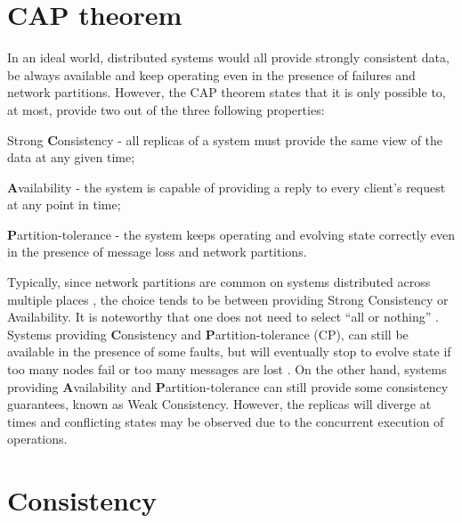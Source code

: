 
\section{CAP theorem}
\label{sec:cap}


In an ideal world, distributed systems would all provide strongly consistent data, be always available and keep operating even in the presence of failures and network partitions.
However, the CAP theorem \cite{cap} states that it is only possible to, at most, provide two out of the three following properties:
\begin{enumerate*}[label=(\roman*)]
	\item Strong \textbf{C}onsistency - all replicas of a system must provide the same view of the data at any given time;
	\item \textbf{A}vailability - the system is capable of providing a reply to every client's request at any point in time;
	\item \textbf{P}artition-tolerance - the system keeps operating and evolving state correctly even in the presence of message loss and network partitions.
\end{enumerate*}

Typically, since network partitions are common on systems distributed across multiple places \cite{understandingEC}, the choice tends to be between providing Strong Consistency or Availability.
It is noteworthy that one does not need to select ``all or nothing'' \cite{understandingEC}. 
Systems providing \textbf{C}onsistency and \textbf{P}artition-tolerance (CP), can still be available in the presence of some faults, but will eventually stop to evolve state if too many nodes fail or too many messages are lost \cite{cap}.
On the other hand, systems providing \textbf{A}vailability and \textbf{P}artition-tolerance can still provide some consistency guarantees, known as Weak Consistency. However, the replicas will diverge at times and conflicting states may be observed due to the concurrent execution of operations.

\section{Consistency}
\label{sec:consistency}

